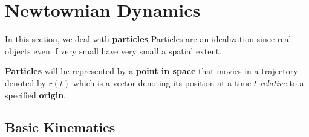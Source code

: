 \chapter{Newtownian Dynamics}

In this section, we deal with {\bf particles} Particles are an idealization since real objects even if very small have very small a spatial extent.

	{\bf Particles} will be represented by a {\bf point in space} that movies in a trajectory denoted by $\underline{r}(t)$ which is a vector denoting its position at a time $t$ {\em relative} to a specified {\bf origin}.

\section{Basic Kinematics}
